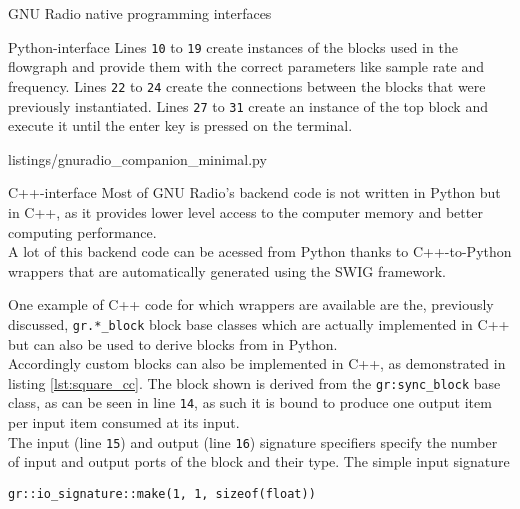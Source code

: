 \begin{subchapter}{GNU Radio native programming interfaces}
\begin{subsubchapter}{Python-interface}
    Lines \texttt{10} to \texttt{19} create instances of the
    blocks used in the flowgraph and provide them with the
    correct parameters like sample rate and frequency.
    Lines \texttt{22} to \texttt{24} create the connections
    between the blocks that were previously instantiated.
    Lines \texttt{27} to \texttt{31} create an instance of the
    top block and execute it until the enter key is pressed
    on the terminal.

    
                    {listings/gnuradio_companion_minimal.py}

  \end{subsubchapter}

  \begin{subsubchapter}{C++-interface}
    Most of GNU Radio's backend code is not written in Python
    but in C++, as it provides lower level access to the computer
    memory and better computing performance. \\

    A lot of this backend code can be acessed from Python
    thanks to C++-to-Python wrappers that are automatically
    generated using the SWIG \cite{swigweb} framework.

    One example of C++ code for which wrappers are available
    are the, previously discussed, \texttt{gr.*\_block} block
    base classes which are actually implemented in C++
    but can also be used to derive blocks from in Python. \\

    Accordingly custom blocks can also be implemented in
    C++, as demonstrated in listing \ref{lst:square_cc}.
    The block shown is derived from the \texttt{gr:sync\_block}
    base class, as can be seen in line \texttt{14}, as
    such it is bound to produce one output item
    per input item consumed at its input. \\

    The input (line \texttt{15}) and output (line \texttt{16})
    signature specifiers specify the number of input and output
    ports of the block and their type.
    The simple input signature

    \begin{center}
      \texttt{gr::io\_signature::make(1, 1, sizeof(float))}
    \end{center}


\end{subsubchapter}
\end{subchapter}
